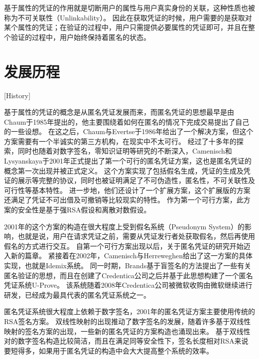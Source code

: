 基于属性的凭证的作用就是切断用户的属性与用户真实身份的关联，这种性质也被称为不可关联性（Unlinkability）。
因此在获取凭证的时候，用户需要的是获取对某个属性的凭证；在验证的过程中，用户只需提供必要属性的凭证即可，并且在整个验证的过程中，用户始终保持着匿名的状态。

\section{发展历程}[History]

基于属性的凭证的概念是从匿名凭证发展而来，而匿名凭证的思想最早是由Chaum\cite{chaum1985security}于1985年提出的，他主要围绕着如何在匿名的情况下完成交易提出了自己的一些设想。
在这之后，Chaum与Evertse于1986年给出了一个解决方案\cite{chaum1986secure}，但这个方案需要有一个半诚实的第三方机构\cite{张严2012匿名凭证方案研究进展,camenisch2001efficient}，在现实中不太可行。
经过了十多年的探索，同时也随着对数字签名，零知识证明等研究的不断深入，Camenisch和Lysyanskaya于2001年正式提出了第一个可行的匿名凭证方案\cite{camenisch2001efficient}，这也是匿名凭证的概念第一次出现并被正式定义。
这个方案实现了包括假名生成，凭证的生成及凭证的展示等完整的协议，同时也被证明满足了不可伪造性，匿名性，不可关联性及可行性等基本特性。
进一步地，他们还设计了一个扩展方案，这个扩展版的方案还满足了凭证不可出借及可撤销等比较现实的特性。
作为第一个可行方案，此方案的安全性是基于强RSA假设和离散对数假设。

2001年的这个方案的构造在很大程度上受到假名系统（Pseudonym System）\cite{chen1996access,lysyanskaya1999pseudonym}的影响，也就是说，用户在请求凭证之前，需要从凭证发行者处获取假名，然后再使用假名的方式进行交互。
自第一个可行方案出现以后，关于匿名凭证的研究开始迈入新的篇章。
紧接着在2002年，Camenisch与Herreweghen给出了这一方案的具体实现，也就是Idemix系统\cite{camenisch2002design}。
同一时期，Brands基于盲签名的方法提出了一些有关匿名验证的思想\cite{brands2000rethinking}，而且在创建了Credentica公司之后并基于此思想构建了一个匿名凭证系统U-Prove。
该系统随着2008年Credentica公司被微软收购由微软继续进行研发\cite{paquin2011u}，已经成为最具代表的匿名凭证系统之一。

匿名凭证系统很大程度上依赖于数字签名，2001年的匿名凭证方案主要使用传统的RSA签名方案。
双线性映射的出现推动了数字签名的发展，随着许多基于双线性映射的签名方案的出现\cite{boneh2001short,camenisch2004signature,okamoto2006efficient}，一些新的匿名凭证的方案构造也涌现出来。
基于双线性对的数字签名构造比较简洁，而且在满足同等安全性下，签名长度相对RSA来说要短得多，如果用于匿名凭证的构造中会大大提高整个系统的效率。

